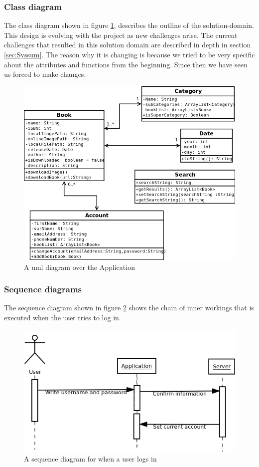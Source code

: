 \documentclass[12pt]{article}
\begin{document}
\subsubsection{Class diagram}
The class diagram shown in figure \ref{uml}, describes the outline of the solution-domain. This design is evolving with the project as new challenges arise. The current challenges that resulted in this solution domain are described in depth in section \ref{sec:Syssum}. The reason why it is changing is because we tried to be very specific about the attributes and functions from the beginning. Since then we have seen us forced to make changes.
\begin{figure}[H]
\includegraphics[scale=0.6]{uml.png}
\caption{A uml diagram over the Application}
\label{uml}
\end{figure}
\subsubsection{Sequence diagrams}

The sequence diagram shown in figure \ref{SeqDiaLogin} shows the chain of inner workings that is executed when the user tries to log in.
\begin{figure}[H]
\includegraphics[scale=0.6]{SequenceDiagramLogin.png}
\caption{A sequence diagram for when a user logs in}
\label{SeqDiaLogin}
\end{figure}
\end{document}
